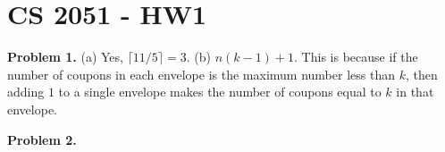 \documentclass[a4paper, 12pt]{article}
\begin{document}
\section{CS 2051 - HW1}

\textbf{Problem 1.} (a) Yes, $\lceil 11/5 \rceil = 3$. \newline
(b) $n(k - 1) + 1$. This is because if the number of coupons in each envelope is the maximum number less than $k$, then adding $1$ to a single envelope makes the number of coupons equal to $k$ in that envelope. \newline

\textbf{Problem 2.} 
\end{document}
